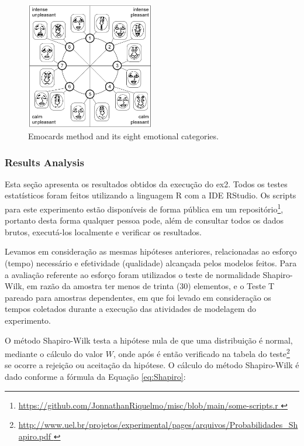 \begin{figure}[!htb]
        \centering
        \caption{Emocards method and its eight emotional categories.}
        \label{fig:EmocardsMethod}
        \includegraphics[width=0.5\textwidth]{img/Emocards.png}
\end{figure}

\subsubsection{Results Analysis}

Esta seção apresenta os resultados obtidos da execução do \ac{ex2}.
Todos os testes estatísticos foram feitos utilizando a linguagem R com a IDE RStudio. 
Os scripts para este experimento estão disponíveis de forma pública em um repositório\footnote{\url{ https://github.com/JonnathanRiquelmo/misc/blob/main/some-scripts.r }}, portanto desta forma qualquer pessoa pode, além de consultar todos os dados brutos, executá-los localmente e verificar os resultados.

Levamos em consideração as mesmas hipóteses anteriores, relacionadas ao esforço (tempo) necessário e efetividade (qualidade) alcançada pelos modelos feitos.
Para a avaliação referente ao esforço foram utilizados o teste de normalidade Shapiro-Wilk, em razão da amostra ter menos de trinta (30) elementos, e o Teste T pareado para amostras dependentes, em que foi levado em consideração os tempos coletados durante a execução das atividades de modelagem do experimento. 

O método Shapiro-Wilk testa a hipótese nula de que uma distribuição é normal, mediante o cálculo do valor $W$, onde após é então verificado na tabela do teste\footnote{\url{ http://www.uel.br/projetos/experimental/pages/arquivos/Probabilidades\_Shapiro.pdf }} se ocorre a rejeição ou aceitação da hipótese. 
O cálculo do método Shapiro-Wilk é dado conforme a fórmula da Equação \ref{eq:Shapiro}: 


